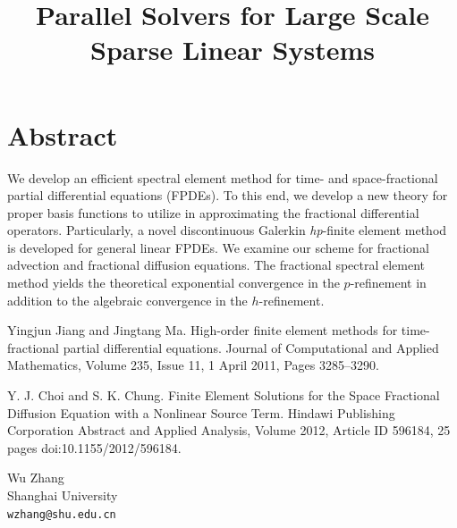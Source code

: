 \documentclass[article, A4, 11pt]{llncs}%
\begin{document}
\section*{Abstract}
We develop an efficient spectral element method for time- and space-fractional partial differential equations (FPDEs). To this end, we develop a new theory for proper basis functions to utilize in approximating the fractional differential operators. Particularly, a novel discontinuous Galerkin \textit{hp}-finite element method is developed for general linear FPDEs. We examine our scheme for fractional advection and fractional diffusion equations. The fractional spectral element method yields the theoretical exponential convergence in the $p$-refinement in addition to the algebraic convergence in the $h$-refinement. 


\begin{thebibliography}{10}
{\sc Yingjun Jiang and Jingtang Ma}. {High-order finite element methods for time-fractional partial differential equations}. Journal of Computational and Applied Mathematics, Volume 235, Issue 11, 1 April 2011, Pages 3285–3290.

{\sc Y. J. Choi and S. K. Chung}. {Finite Element Solutions for the Space Fractional Diffusion Equation with a Nonlinear Source Term}. Hindawi Publishing Corporation Abstract and Applied Analysis, Volume 2012, Article ID 596184, 25 pages doi:10.1155/2012/596184.
\end{thebibliography} %

\title{Parallel Solvers for Large Scale Sparse Linear Systems}
 \author{} \institute{}
\maketitle
\begin{center}
{\large Wu Zhang}\\
Shanghai University\\
{\tt wzhang@shu.edu.cn}
\end{center}
\end{document}
